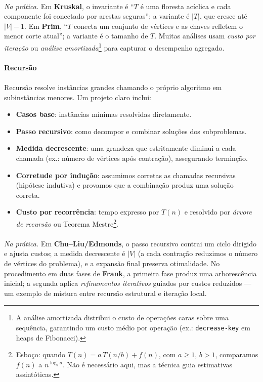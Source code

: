 \documentclass[12pt,a4paper]{article}
\begin{document}
\paragraph{}
	\textit{Na prática.} Em \textbf{Kruskal}, o invariante é “$T$ é uma floresta acíclica e cada componente foi conectado por arestas seguras”; a variante é $|T|$, que cresce até $|V|-1$. Em \textbf{Prim}, “$T$ conecta um conjunto de vértices e as chaves refletem o menor corte atual”; a variante é o tamanho de $T$. Muitas análises usam \emph{custo por iteração} ou \emph{análise amortizada}\footnote{A análise amortizada distribui o custo de operações caras sobre uma sequência, garantindo um custo médio por operação (ex.: \texttt{decrease-key} em heaps de Fibonacci).} para capturar o desempenho agregado.

\paragraph{Recursão}
\paragraph{}
Recursão resolve instâncias grandes chamando o próprio algoritmo em subinstâncias menores. Um projeto claro inclui:

\begin{itemize}\setlength{\itemsep}{2pt}
    \item \textbf{Casos base}: instâncias mínimas resolvidas diretamente.
    \item \textbf{Passo recursivo}: como decompor e combinar soluções dos subproblemas.
    \item \textbf{Medida decrescente}: uma grandeza que estritamente diminui a cada chamada (ex.: número de vértices após contração), assegurando terminção.
    \item \textbf{Corretude por indução}: assumimos corretas as chamadas recursivas (hipótese indutiva) e provamos que a combinação produz uma solução correta.
    \item \textbf{Custo por recorrência}: tempo expresso por $T(n)$ e resolvido por \emph{árvore de recursão} ou Teorema Mestre\footnote{Esboço: quando $T(n)=a\,T(n/b)+f(n)$, com $a\ge 1$, $b>1$, comparamos $f(n)$ a $n^{\log_b a}$. Não é necessário aqui, mas a técnica guia estimativas assintóticas.}.
\end{itemize}

\paragraph{}
	\textit{Na prática.} Em \textbf{Chu–Liu/Edmonds}, o passo recursivo contrai um ciclo dirigido e ajusta custos; a medida decrescente é $|V|$ (a cada contração reduzimos o número de vértices do problema), e a expansão final preserva otimalidade. No procedimento em duas fases de \textbf{Frank}, a primeira fase produz uma arborescência inicial; a segunda aplica \emph{refinamentos iterativos} guiados por custos reduzidos — um exemplo de mistura entre recursão estrutural e iteração local.
\end{document}
